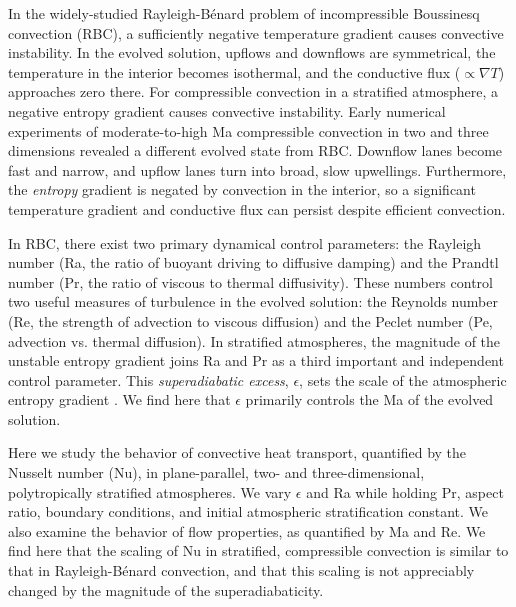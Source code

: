 \documentclass[aps, pre, onecolumn, nofootinbib, notitlepage, groupedaddress, amsfonts, amssymb, amsmath, longbibliography]{revtex4-1}
\newcommand{\grad}{\ensuremath{\nabla}}
\newcommand{\RB}{Rayleigh-B\'{e}nard }
\begin{document}
In the widely-studied \RB problem of incompressible Boussinesq convection (RBC), 
a sufficiently negative temperature gradient causes convective instability.
In the evolved solution, upflows and downflows are symmetrical, the
temperature in the interior becomes isothermal, and
the conductive flux ($\propto \grad T$) approaches 
zero there. 
For compressible convection in a stratified atmosphere, a
negative entropy gradient causes convective instability.
Early numerical experiments of moderate-to-high Ma compressible convection
in two \cite{graham1975, chan&all1982,
hurlburt&all1984, cattaneo&all1990} and three 
\cite{cattaneo&all1991, brandenburg&all2005, brummell&all1996} dimensions
revealed a different evolved state from RBC.
Downflow lanes
become fast and narrow, and upflow lanes turn into broad, slow upwellings.
Furthermore, the \emph{entropy} gradient is negated by convection in the interior, so
a significant temperature gradient and conductive flux can persist despite
efficient convection.

In RBC, there exist two primary dynamical control parameters: 
the Rayleigh number (Ra, the ratio of
buoyant driving to diffusive damping) and the Prandtl number 
(Pr, the ratio of viscous to thermal
diffusivity). These numbers control two useful
measures of turbulence in the evolved solution:
the Reynolds
number (Re, the strength of advection to viscous diffusion)
and the Peclet number (Pe, advection vs. thermal diffusion).  
In stratified atmospheres, the magnitude of the unstable entropy gradient
joins Ra and Pr as a third important and independent control parameter.  This 
\emph{superadiabatic excess}, $\epsilon$,
sets the scale of the atmospheric entropy gradient \cite{graham1975}.
We find here that $\epsilon$ primarily controls the Ma of the evolved solution.

Here we study the behavior of convective heat transport, 
quantified by the Nusselt number (Nu), in plane-parallel, 
two- and three-dimensional, polytropically stratified atmospheres.  
We vary $\epsilon$ and Ra while holding Pr, aspect ratio, boundary conditions,
and initial atmospheric stratification
constant.  We also examine the behavior of flow properties, as quantified by Ma and Re.
We find here that the scaling of Nu in stratified, compressible convection 
is similar to that in \RB convection,
and that this scaling is not appreciably changed by the magnitude of the superadiabaticity.
\end{document}
